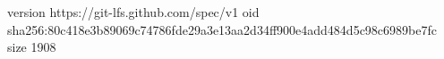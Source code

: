 version https://git-lfs.github.com/spec/v1
oid sha256:80c418e3b89069c74786fde29a3e13aa2d34ff900e4add484d5c98c6989be7fc
size 1908
